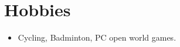 

\section{Hobbies}
\begin{itemize} %
    \item Cycling, Badminton, PC open world games.
\end{itemize} %